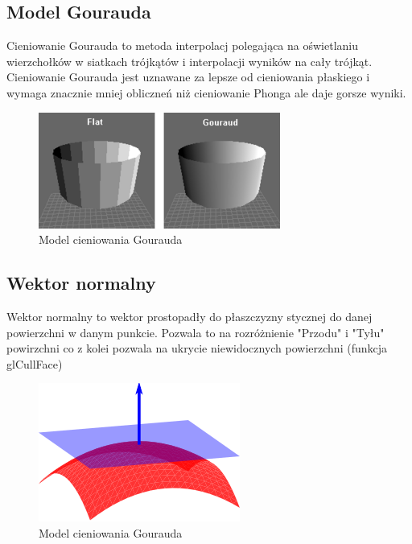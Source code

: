 \documentclass{article}
\begin{document}
  \subsection{Model Gourauda}
  Cieniowanie Gourauda to metoda interpolacj polegająca na oświetlaniu wierzchołków 
  w siatkach trójkątów i interpolacji wyników na cały trójkąt. Cieniowanie Gourauda
  jest uznawane za lepsze od cieniowania płaskiego i wymaga znacznie mniej obliczneń
  niż cieniowanie Phonga ale daje gorsze wyniki.
  \begin{figure}[ht]
    \centering
    \includegraphics[width=\textwidth]{images/D3D_Shading_Modes.png}
    \caption{Model cieniowania Gourauda}
    \label{fig:gour}
  \end{figure}
  \FloatBarrier
  \subsection{Wektor normalny}
  Wektor normalny to wektor prostopadły do płaszczyzny stycznej do danej powierzchni w danym punkcie.
  Pozwala to na rozróżnienie "Przodu" i "Tyłu" powirzchni co z kolei pozwala na ukrycie niewidocznych 
  powierzchni (funkcja glCullFace)
  \begin{figure}[ht]
    \centering
    \includegraphics[width=\textwidth]{images/Surface_normal_illustration.svg.png}
    \caption{Model cieniowania Gourauda}
    \label{fig:normal}
  \end{figure}
  \FloatBarrier
\end{document}
